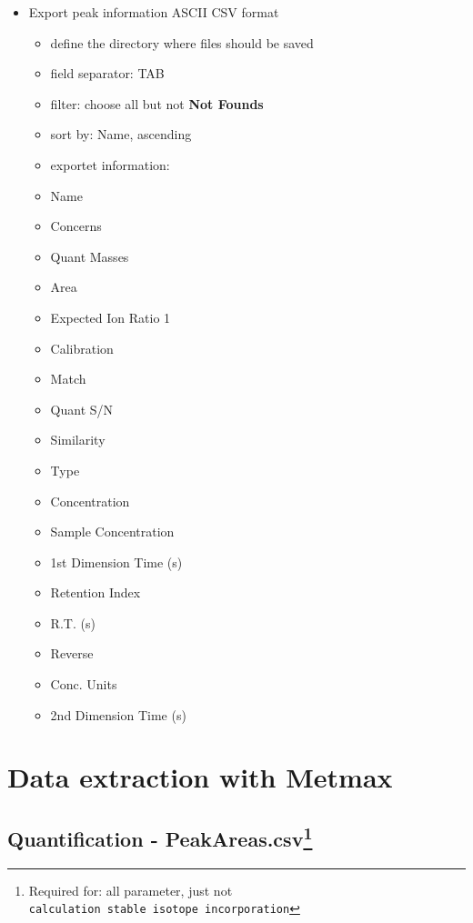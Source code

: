 \documentclass[]{book}
\providecommand{\tightlist}{%
  \setlength{\itemsep}{0pt}\setlength{\parskip}{0pt}}
\let\rmarkdownfootnote\footnote%
\def\footnote{\protect\rmarkdownfootnote}
\theoremstyle{definition}
\theoremstyle{definition}
\theoremstyle{definition}
\theoremstyle{remark}
\begin{document}
\begin{itemize}
\tightlist
\item
  Export peak information ASCII CSV format

  \begin{itemize}
  \tightlist
  \item
    define the directory where files should be saved
  \item
    field separator: TAB
  \item
    filter: choose all but not \textbf{Not Founds}
  \item
    sort by: Name, ascending
  \item
    exportet information:
  \item
    Name
  \item
    Concerns
  \item
    Quant Masses
  \item
    Area
  \item
    Expected Ion Ratio 1
  \item
    Calibration
  \item
    Match
  \item
    Quant S/N
  \item
    Similarity
  \item
    Type
  \item
    Concentration
  \item
    Sample Concentration
  \item
    1st Dimension Time (s)
  \item
    Retention Index
  \item
    R.T. (s)
  \item
    Reverse
  \item
    Conc. Units
  \item
    2nd Dimension Time (s)
  \end{itemize}
\end{itemize}

\section{Data extraction with Metmax}\label{metmax-dataextr}

\subsection[Quantification -
PeakAreas.csv]{\texorpdfstring{Quantification - PeakAreas.csv\footnote{Required
  for: all parameter, just not
  \texttt{calculation\ stable\ isotope\ incorporation}}}{Quantification - PeakAreas.csv}}\label{quantification---peakareas.csv}
\end{document}
